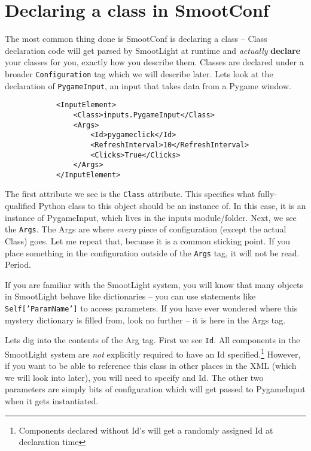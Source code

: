 \documentclass{article}
\begin{document}
    \section{Declaring a class in SmootConf}
        The most common thing done is SmootConf is declaring a class -- Class declaration code will
        get parsed by SmootLight at runtime and \emph{actually} \textbf{declare} your classes for
        you, exactly how you describe them.  Classes are declared under a broader
        \texttt{Configuration} tag which we will describe later.  Lets look at the declaration of
        \texttt{PygameInput}, an input that takes data from a Pygame window.
        \begin{verbatim}
            <InputElement>
                <Class>inputs.PygameInput</Class>
                <Args>
                    <Id>pygameclick</Id>
                    <RefreshInterval>10</RefreshInterval>
                    <Clicks>True</Clicks>
                </Args>
            </InputElement>
        \end{verbatim}
        The first attribute we see is the \texttt{Class} attribute.  This specifies what
        fully-qualified Python class to this object should be an instance of.  In this case, it is
        an instance of PygameInput, which lives in the inputs module/folder.  Next, we see the
        \texttt{Args}.  The Args are where \emph{every} piece of configuration (except the actual
        Class) goes.  Let me repeat that, becuase it is a common sticking point.  If you place
        something in the configuration outside of the \texttt{Args} tag, it will not be read.
        Period.

        If you are familiar with the SmootLight system, you will know that many objects in
        SmootLight behave like dictionaries -- you can use statements like
        \texttt{Self['ParamName']} to access parameters.  If you have ever wondered where this
        mystery dictionary is filled from, look no further -- it is here in the Args tag.  

        Lets dig into the contents of the Arg tag.  First we see \texttt{Id}.  All components in the
        SmootLight system are \emph{not} explicitly required to have an Id
        specified.\footnote{Components declared without Id's will get a randomly assigned Id at
        declaration time}
        However, if you want to be able to reference this class in other places in the XML (which
        we will look into later), you will need to specify and Id.  The other two parameters are
        simply bits of configuration which will get passed to PygameInput when it gets instantiated.
        
\end{document}
